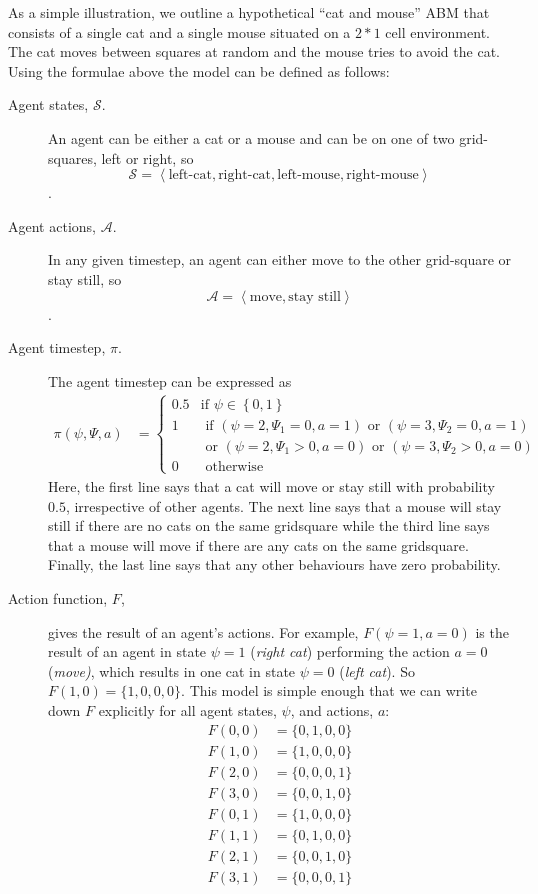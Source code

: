 \documentclass{article}
\begin{document}
As a simple illustration, we outline a hypothetical ``cat and mouse'' ABM that consists of a single cat and a single mouse situated on a $2*1$ cell environment. The cat moves between squares at random and the mouse tries to avoid the cat. Using the formulae above the model can be defined as follows:
\begin{description}
	\item[Agent states, $\mathcal{S}$.] An agent can be either a cat or a mouse and can be on one of two grid-squares, left or right, so \[\mathcal{S} = \left<\textrm{left-cat}, \textrm{right-cat}, \textrm{left-mouse}, \textrm{right-mouse} \right>\]. 

	\item[Agent actions, $\mathcal{A}$.] In any given timestep, an agent can either move to the other grid-square or stay still, so \[\mathcal{A} = \left<\textrm{move}, \textrm{stay still}\right>\].
	

	\item[Agent timestep, $\pi$.] The agent timestep can be expressed as
	\[
	\begin{aligned}
	\pi(\psi, \Psi, a) &=
	\begin{cases}
	0.5 & \text{if } \psi \in \left\{0, 1\right\}\\  %
	1 & \text{ if }(\psi = 2, \Psi_1 = 0, a=1) \text{ or } (\psi=3, \Psi_2 = 0, a=1)\\
	& \text{ or } (\psi = 2, \Psi_1 > 0, a=0) \text{ or } (\psi=3, \Psi_2 > 0, a=0)\\
	0 & \text{ otherwise}
	\end{cases}
	\end{aligned}
	\]
	 Here, the first line says that a cat will move or stay still with probability $0.5$, irrespective of other agents. The next line says that a mouse will stay still if there are no cats on the same gridsquare while the third line says that a mouse will move if there are any cats on the same gridsquare. Finally, the last line says that any other behaviours have zero probability.

\item[Action function, $F$,] gives the result of an agent's actions. For example, $F(\psi=1, a=0)$ is the result of an agent in state $\psi=1$ (\textit{right cat}) performing the action $a=0$ (\textit{move)}, which results in one cat in state $\psi=0$ (\textit{left cat}). So $F(1,0) = \{1,0,0,0\}$. This model is simple enough that we can write down $F$ explicitly for all agent states, $\psi$, and actions, $a$:
\[
\begin{aligned}
F(0, 0) &= \{0,1,0,0\}\\
F(1, 0) &= \{1,0,0,0\}\\
F(2, 0) &= \{0,0,0,1\}\\
F(3, 0) &= \{0,0,1,0\}\\
F(0, 1) &= \{1,0,0,0\}\\
F(1, 1) &= \{0,1,0,0\}\\
F(2, 1) &= \{0,0,1,0\}\\
F(3, 1) &= \{0,0,0,1\}\\
\end{aligned}
\]
\end{description}
\end{document}
